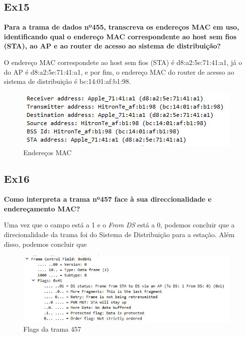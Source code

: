 \documentclass{article}
\begin{document}
\subsection{Ex15}
\textbf{Para a trama de dados nº455, transcreva os endereços MAC em uso, identificando qual o endereço MAC correspondente ao host sem fios (STA), ao AP e ao router de acesso ao sistema de distribuição?}\\\par
O endereço MAC correspondete ao host sem fios (STA) é d8:a2:5e:71:41:a1, já o do AP é d8:a2:5e:71:41:a1, e por fim, o endereço MAC do router de acesso ao sistema de distribuição é bc:14:01:af:b1:98.
\begin{figure}[h]
	\centering
	\includegraphics[scale = 0.6]{ex-15.JPG}
	\caption{Endereços MAC}
\end{figure}

\subsection{Ex16}
\textbf{Como interpreta a trama nº457 face à sua direccionalidade e endereçamento MAC?}\\\par
Uma vez que o campo  está a 1 e o \textit{From DS} está a 0, podemos concluir que a direcionalidade da trama foi do Sistema de Distribuição para a estação. Além disso, podemos concluir que 
\begin{figure}[h]
	\centering
	\includegraphics[scale = 0.6]{ex-16.JPG}
	\caption{Flags da trama 457}
\end{figure}
\end{document}
